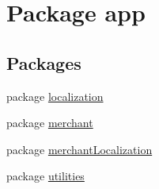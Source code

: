 \hypertarget{namespaceapp}{\section{Package app}
\label{namespaceapp}
}
\subsection*{Packages}
\begin{DoxyCompactItemize}
\item 
package \hyperlink{namespaceapp_1_1localization}{localization}
\item 
package \hyperlink{namespaceapp_1_1merchant}{merchant}
\item 
package \hyperlink{namespaceapp_1_1merchant_localization}{merchant\-Localization}
\item 
package \hyperlink{namespaceapp_1_1utilities}{utilities}
\end{DoxyCompactItemize}

